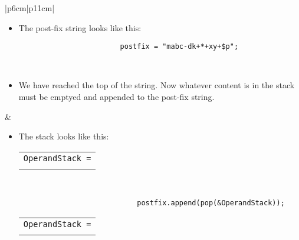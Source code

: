 \begin{center}
\begin{longtable}{ |p{6cm}|p{11cm}| }
\begin{itemize}
            \item The post-fix string looks like this:
                {
                    \begin{verbatim}
                        postfix = "mabc-dk+*+xy+$p";
                    \end{verbatim}
                }
        \end{itemize}
        \\ 
        \hline
        \hline
        \begin{itemize}
            \item We have reached the top of the string. Now whatever content is in the stack must be emptyed and appended to the post-fix string.
        \end{itemize}
        & 
        \begin{itemize}
            \item The stack looks like this: 
                {
                    \begin{center}
                        \begin{tabular}{ c }
                            \texttt{OperandStack =} \\ \\
                        \end{tabular}
                        \begin{bytefield}{10}
                             \\
                        \end{bytefield}
                        \begin{verbatim}
                            postfix.append(pop(&OperandStack));
                        \end{verbatim}
                        \begin{tabular}{ c }
                            \texttt{OperandStack =} \\ \\
                        \end{tabular}
                        \begin{bytefield}{10}
                             \\
                        \end{bytefield}
                        \begin{verbatim}

\end{verbatim}
\end{center}}
\end{itemize}
\end{longtable}
\end{center}
